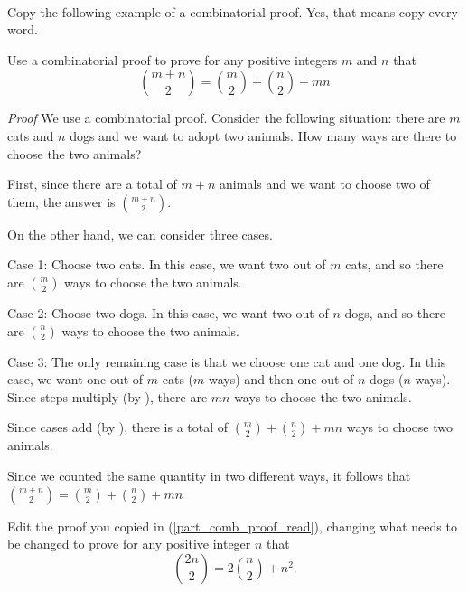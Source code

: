 \begin{act}
\label{act_comb_proof_two_animals} 
~
    \begin{actpart}
        \item \label{part_comb_proof_read} Copy the following example of a combinatorial proof. Yes, that means copy every word.
        
        Use a combinatorial proof to prove for any positive integers $m$ and $n$ that $$\binom{m+n}{2} = \binom{m}{2} + \binom{n}{2} + mn$$
        
        \emph{Proof}  We use a combinatorial proof.  Consider the following situation: there are $m$ cats and $n$ dogs and we want to adopt two animals.  How many ways are there to choose the two animals?
            
        First, since there are a total of $m+n$ animals and we want to choose two of them, the answer is $\binom{m+n}{2}.$
            
        On the other hand, we can consider three cases.

        Case 1: Choose two cats.  In this case, we want two out of $m$ cats, and so there are $\binom{m}{2}$ ways to choose the two animals.
            
        Case 2: Choose two dogs.  In this case, we want two out of $n$ dogs, and so there are $\binom{n}{2}$ ways to choose the two animals.
            
        Case 3: The only remaining case is that we choose one cat and one dog.  In this case, we want one out of $m$ cats ($m$ ways) and then one out of $n$ dogs ($n$ ways).  Since steps multiply (by ), there are $mn$ ways to choose the two animals.
            
        Since cases add (by ), there is a total of $\binom{m}{2} + \binom{n}{2} + mn$ ways to choose two animals.
            
        Since we counted the same quantity in two different ways, it follows that $\binom{m+n}{2} =\binom{m}{2} + \binom{n}{2} + mn$
        
        \item Edit the proof you copied in (\ref{part_comb_proof_read}), changing what needs to be changed to prove for any positive integer $n$ that $$\binom{2n}{2} = 2\binom{n}{2} + n^2.$$
        
    \end{actpart}   
\end{act}

